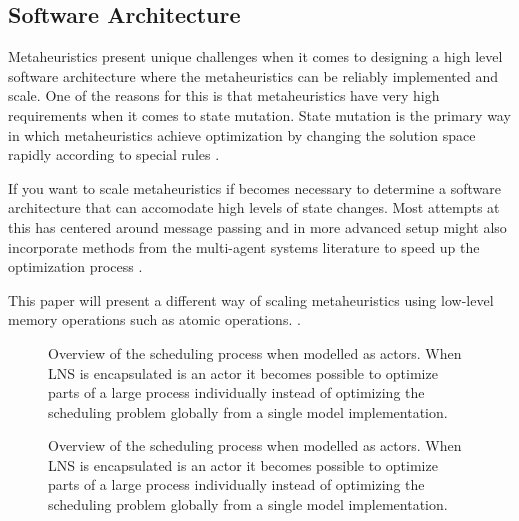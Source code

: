 \subsection{Software Architecture}
Metaheuristics present unique challenges when it comes to designing a high level software architecture
where the metaheuristics can be reliably implemented and scale. One of the reasons for this is that 
metaheuristics have very high requirements when it comes to state mutation. State mutation is the 
primary way in which metaheuristics achieve optimization by changing the solution space rapidly
according to special rules \citep{gendreauHandbookMetaheuristics2019}. 

If you want to scale metaheuristics if becomes necessary to determine a software architecture that 
can accomodate high levels of state changes. Most attempts at this has centered around message
passing \citep{talbiMetaheuristicsDesignImplementation2009} and in more advanced setup might 
also incorporate methods from the multi-agent systems literature to 
speed up the optimization process \citep{MultiagentMetaheuristicOptimization}.

This paper will present a different way of scaling metaheuristics using low-level memory operations
such as atomic operations. \citep{!!! CITE THE LOCK FREE DATA STRUCTURE ARTICLE}.

% 	
\begin{figure}[H]
	\centering
	
	\resizebox{0.7\textwidth}{!}{
		\drawModelSetupHexagon[persistence=true]
	}
	\caption{
		Overview of the scheduling process when modelled as actors. When LNS is encapsulated 
		is an actor it becomes possible to optimize parts of a large process individually instead of 
		optimizing the scheduling problem globally from a single model implementation.
	}\label{fig:ordinator-hexagon:persistence}
\end{figure}
\begin{figure}[H]
	\centering
	
	\resizebox{0.7\textwidth}{!}{
		\drawModelSetupHexagon[atomicpointerswap=true]
	}
	\caption{
		Overview of the scheduling process when modelled as actors. When LNS is encapsulated 
		is an actor it becomes possible to optimize parts of a large process individually instead of 
		optimizing the scheduling problem globally from a single model implementation.
	}
	\label{fig:ordinator-hexagon:atomicpointerswap}
\end{figure}

